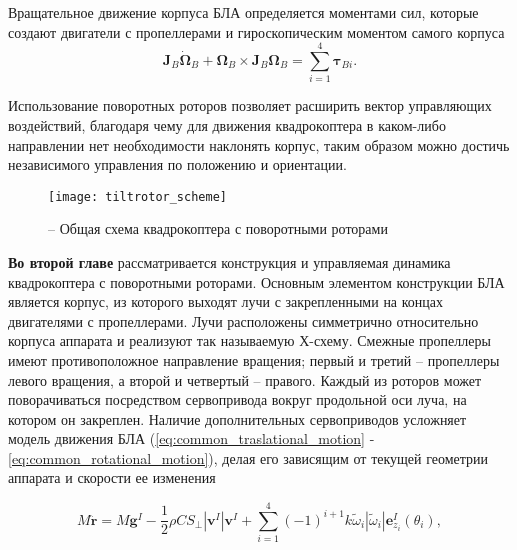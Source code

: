 Вращательное движение корпуса БЛА определяется моментами сил, которые создают двигатели с пропеллерами и гироскопическим моментом самого корпуса
\begin{equation} \label{eq:common_rotational_motion}
\bm{J}_B\dot{\bm{\Omega}}_B + \bm{\Omega}_B \times  \bm{J}_B{\bm{\Omega}_B} = \sum_{i=1}^{4}{\bm{\tau}_{Bi}}.
\end{equation}

Использование поворотных роторов позволяет расширить вектор управляющих воздействий, благодаря чему для движения квадрокоптера в каком-либо направлении нет необходимости наклонять корпус, таким образом можно достичь независимого управления по положению и ориентации.

\begin{figure}[H]
	\centering
	\texttt{[image: tiltrotor\_scheme]}
	\caption{ -- Общая схема квадрокоптера с поворотными роторами}
	\label{fig:tiltrotor_scheme}
\end{figure}

\textbf{Во второй главе} рассматривается конструкция и управляемая динамика квадрокоптера с поворотными роторами.
Основным элементом конструкции БЛА является корпус, из которого выходят лучи с закрепленными на концах двигателями с пропеллерами.
Лучи расположены симметрично относительно корпуса аппарата и реализуют так называемую Х-схему.
Смежные пропеллеры имеют противоположное направление вращения; первый и третий – пропеллеры левого вращения, а второй и четвертый – правого.
Каждый из роторов может поворачиваться посредством сервопривода вокруг продольной оси луча, на котором он закреплен.
Наличие дополнительных сервоприводов усложняет модель движения БЛА (\ref{eq:common_traslational_motion} - \ref{eq:common_rotational_motion}), делая его зависящим от текущей геометрии аппарата и скорости ее изменения

\begin{equation} \label{eq:m_traslational_motion}
M \ddot{\bm{r}} = M \bm{g}^I - \frac{1}{2} \rho C S_{\perp} |\bm{v}^I| \bm{v}^I + \sum_{i=1}^{4}{ { (-1)^{i+1} k \tilde \omega_i |\tilde \omega_i| \bm{e}^I_{z_i}}(\theta_i)},
\end{equation}

